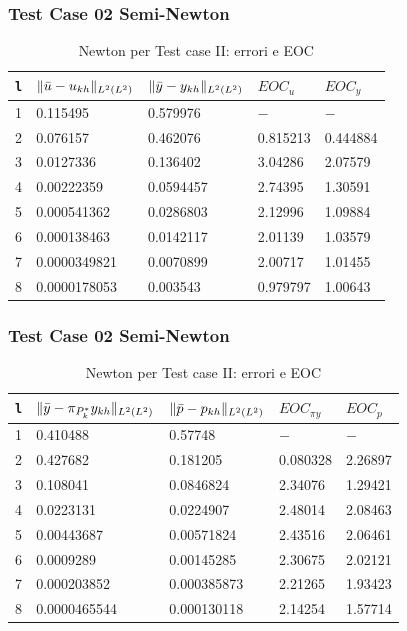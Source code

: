 \documentclass{beamer}
\theoremstyle{definition}
\theoremstyle{remark}
\theoremstyle{plain}
\theoremstyle{definition}
\DeclarePairedDelimiter{\norma}{\lVert}{\rVert}
\begin{document}
\begin{frame}
\frametitle{Test Case 02 Semi-Newton}
\begin{table}
\caption{Newton per Test case II: errori e EOC }
\label{newtonII}
\centering

\begin{tabular}{cllll}
\toprule
{\texttt{l}} &  {$ \norma{\bar{u}-u_{kh}}_{L^2(L^2)} $} &  {$ \norma{\bar{y}-y_{kh}}_{L^2(L^2)} $} &  {$ EOC_{u} $} &  {$ EOC_y $} \\
\midrule
1            &  0.115495 &  0.579976 &  {$-$} &  {$-$} \\
2            &  0.076157  &  0.462076 &  0.815213 &  0.444884 \\
3            &  0.0127336  &  0.136402 &  3.04286 &  2.07579 \\
4            &  0.00222359 &  0.0594457 &  2.74395 &  1.30591 \\
5            &  0.000541362 &  0.0286803 &  2.12996 &  1.09884 \\
6            &  0.000138463  &  0.0142117 &  2.01139 &  1.03579 \\
7            &  0.0000349821 &  0.0070899 &  2.00717 &  1.01455 \\      
8            &  0.0000178053 &  0.003543 &  0.979797  &  1.00643 \\
\bottomrule
\end{tabular}              

\end{table}
\end{frame}

\begin{frame}
\frametitle{Test Case 02 Semi-Newton}
\begin{table}
\caption{Newton per Test case II: errori e EOC }
\label{newtonIIbis}
\centering

\begin{tabular}{cllll}
\toprule
{\texttt{l}}  &  {$ \norma{\bar{y}-\pi_{P^*_k}y_{kh}}_{L^2(L^2)} $}  &  {$ \norma{\bar{p}-p_{kh}}_{L^2(L^2)} $}        &  {$ EOC_{\pi y} $} &  {$ EOC_p $} \\
\midrule
1 			 &  0.410488 &  0.57748 &  {$-$} & {$-$} \\
2            &  0.427682 &  0.181205 &  0.080328 &  2.26897 \\
3            &  0.108041 &  0.0846824 &  2.34076 &  1.29421 \\
4            &  0.0223131  &  0.0224907 &  2.48014 &  2.08463 \\
5            &  0.00443687 &  0.00571824 &  2.43516  &  2.06461 \\
6            &  0.0009289  &  0.00145285 &  2.30675 &  2.02121 \\
7            &  0.000203852 &  0.000385873 &  2.21265 &  1.93423 \\      
8            &  0.0000465544 &  0.000130118 &  2.14254 &  1.57714 \\
\bottomrule
\end{tabular}              

\end{table}

\end{frame}
\end{document}
